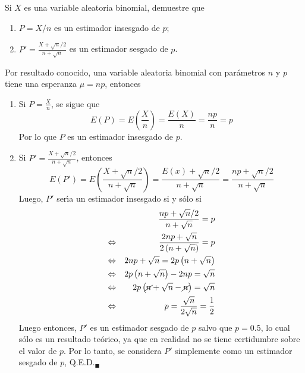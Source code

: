 \begin{enunciado}
 Si $X$ es una variable aleatoria binomial, demuestre que
 \begin{enumerate}
  \item $P = X/n$ es un estimador insesgado de $p$;
  \item $P' = \frac{X + \sqrt{n}/2}{n + \sqrt{n}}$ es un estimador sesgado de $p$.
 \end{enumerate}
\end{enunciado}

\begin{solucion}
 Por resultado conocido, una variable aleatoria binomial con par\'ametros $n$ y $p$ tiene una esperanza $\mu = np$, entonces
 \begin{enumerate}
  \item Si $P=\frac{X}{n}$, se sigue que
  \begin{equation*}
   E(P) = E\left( \frac{X}{n} \right) = \frac{E(X)}{n} = \frac{np}{n} = p
  \end{equation*}
  Por lo que $P$ es un estimador insesgado de $p$.
  
  \item Si $P' = \frac{X + \sqrt{n}/2}{n + \sqrt{n}}$, entonces
  \begin{equation*}
   E(P') = E\left( \frac{X + \sqrt{n}/2}{n + \sqrt{n}} \right) = \frac{E(x) + \sqrt{n}/2}{n + \sqrt{n}} = \frac{np + \sqrt{n}/2}{n + \sqrt{n}}
  \end{equation*}
  Luego, $P'$ ser\'{\i}a un estimador insesgado si y s\'olo si
  \begin{eqnarray*}
   & & \frac{np + \sqrt{n}/2}{n + \sqrt{n}} = p \\
   \Leftrightarrow & & \frac{2np+\sqrt{n}}{2\left(n+\sqrt{n}\right)} = p \\ 
   \Leftrightarrow & & 2np + \sqrt{n} = 2p\left( n + \sqrt{n} \right) \\
   \Leftrightarrow & & 2p\left( n + \sqrt{n} \right) - 2np = \sqrt{n} \\ 
   \Leftrightarrow & & 2p\left( \cancel{n} + \sqrt{n} - \cancel{n} \right) = \sqrt{n} \\ 
   \Leftrightarrow & & p = \frac{\sqrt{n}}{2\sqrt{n}} = \frac{1}{2}
  \end{eqnarray*}
  Luego entonces, $P'$ es un estimador sesgado de $p$ salvo que $p = 0.5$, lo cual s\'olo es un resultado te\'orico, ya que en realidad no se tiene certidumbre sobre el valor de $p$.
  Por lo tanto, se considera $P'$ simplemente como un estimador sesgado de $p$, Q.E.D.${}_{\blacksquare}$
 \end{enumerate}
\end{solucion}

